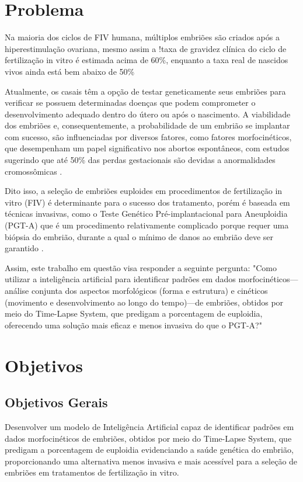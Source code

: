 \section{Problema}

Na maioria dos ciclos de FIV humana, múltiplos embriões são criados após a hiperestimulação ovariana, mesmo assim a !taxa de gravidez clínica do ciclo de fertilização in vitro é estimada acima de 60\%, enquanto a taxa real de nascidos vivos ainda está bem abaixo de 50\% \cite{salame2024} 

Atualmente, os casais têm a opção de testar geneticamente seus embriões para verificar se possuem determinadas doenças que podem comprometer o desenvolvimento adequado dentro do útero ou após o nascimento. A viabilidade dos embriões e, consequentemente, a probabilidade de um embrião se implantar com sucesso, são influenciadas por diversos fatores, como fatores morfocinéticos, que desempenham um papel significativo nos abortos espontâneos, com estudos sugerindo que até 50\% das perdas gestacionais são devidas a anormalidades cromossômicas \cite{scienceofbiogenetics2024}. 

Dito isso, a seleção de embriões euploides em procedimentos de fertilização in vitro (FIV) é determinante para o sucesso dos tratamento, porém é baseada em técnicas invasivas, como o Teste Genético Pré-implantacional para Aneuploidia (PGT-A) que é um procedimento relativamente complicado porque requer uma biópsia do embrião, durante a qual o mínimo de danos ao embrião deve ser garantido \cite{yang2024}. 

Assim, este trabalho em questão visa responder a seguinte pergunta: "Como utilizar a inteligência artificial para identificar padrões em dados morfocinéticos—análise conjunta dos aspectos morfológicos (forma e estrutura) e cinéticos (movimento e desenvolvimento ao longo do tempo)—de embriões, obtidos por meio do Time-Lapse System, que predigam a porcentagem de euploidia, oferecendo uma solução mais eficaz e menos invasiva do que o PGT-A?"


\section{Objetivos}

\subsection{Objetivos Gerais}
Desenvolver um modelo de Inteligência Artificial capaz de identificar padrões em dados morfocinéticos de embriões, obtidos por meio do Time-Lapse System, que predigam a porcentagem de euploidia evidenciando a saúde genética do embrião, proporcionando uma alternativa menos invasiva e mais acessível para a seleção de embriões em tratamentos de fertilização in vitro.

